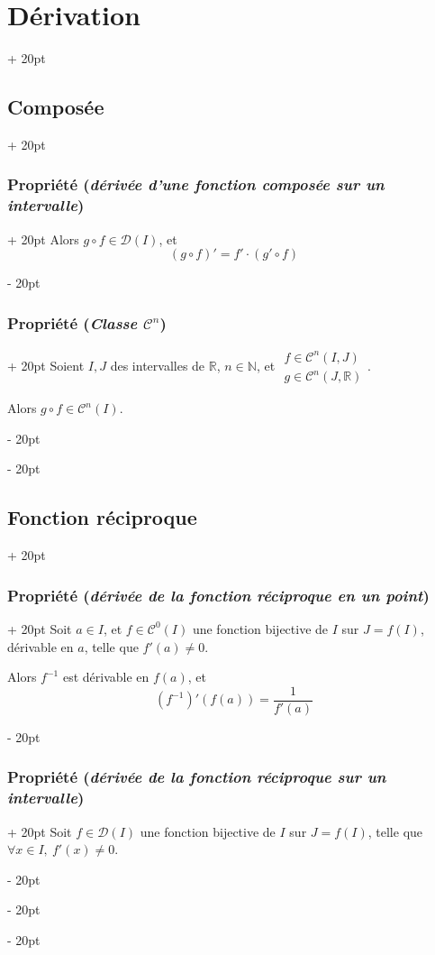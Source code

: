 \documentclass[a4paper, 12pt, twoside]{article}
\newcommand{\N}{\mathbb{N}} %
\newcommand{\R}{\mathbb{R}} %
\newcommand{\lr}[1]{\left( #1 \right)}
\newcommand{\ind}[1][20pt]{\advance\leftskip + #1}
\newcommand{\deind}[1][20pt]{\advance\leftskip - #1}
\newenvironment{indt}[2][20pt]{#2 \par \ind[#1]}{\par \deind} %
\begin{document}
\begin{indt}{\section{Dérivation}}
\begin{indt}{\subsection{Composée}}
\begin{indt}{\subsubsection{Propriété (\textit{dérivée d'une fonction composée sur un intervalle})}}
                Alors $g \circ f \in \mathcal D(I)$, et
                \[
                    (g \circ f)' = f' \cdot (g' \circ f)
                \]
            \end{indt}

            \vspace{12pt}
            
            \begin{indt}{\subsubsection{Propriété (\textit{Classe $\mathcal C^n$})}}
                Soient $I, J$ des intervalles de $\R$, $n \in \N$, et
                $
                    \begin{array}{|l}
                        f \in \mathcal C^n(I, J)
                        \\
                        g \in \mathcal C^n(J, \R)
                    \end{array}
                $.

                Alors $g \circ f \in \mathcal C^n(I)$.
            \end{indt}
        \end{indt}

        \vspace{12pt}
        
        \begin{indt}{\subsection{Fonction réciproque}}
            \begin{indt}{\subsubsection{Propriété (\textit{dérivée de la fonction réciproque en un point})}}
                Soit $a \in I$, et $f \in \mathcal C^0(I)$ une fonction bijective de $I$ sur $J = f(I)$, dérivable en $a$, telle que $f'(a) \neq 0$.

                Alors $f^{-1}$ est dérivable en $f(a)$, et
                \[
                    \lr{f^{-1}}'\!\lr{f(a)} = \dfrac{1}{f'(a)}
                \]
            \end{indt}

            \vspace{12pt}
            
            \begin{indt}{\subsubsection{Propriété (\textit{dérivée de la fonction réciproque sur un intervalle})}}
                Soit $f \in \mathcal D(I)$ une fonction bijective de $I$ sur $J = f(I)$, telle que $\forall x \in I,\ f'(x) \neq 0$.


\end{indt}
\end{indt}
\end{indt}
\end{document}
